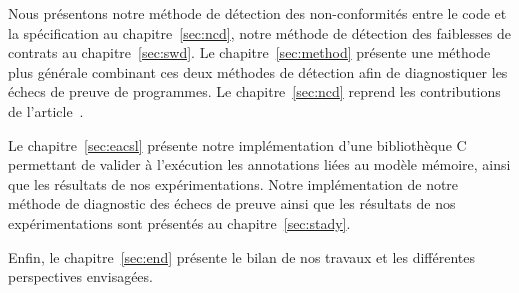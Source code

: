 Nous présentons notre méthode de détection des non-conformités entre le code et
la spécification au chapitre~\ref{sec:ncd}, notre méthode de détection des
faiblesses de contrats au chapitre~\ref{sec:swd}.
Le chapitre~\ref{sec:method} présente une méthode plus générale combinant ces
deux méthodes de détection afin de diagnostiquer les échecs de preuve de
programmes.
Le chapitre~\ref{sec:ncd} reprend les contributions de
l'article~\cite{Petiot/TAP14}.

Le chapitre~\ref{sec:eacsl} présente notre implémentation d'une bibliothèque C
permettant de valider à l'exécution les annotations \acsl liées au modèle
mémoire, ainsi que les résultats de nos expérimentations.
Notre implémentation de notre méthode de diagnostic des échecs de preuve ainsi
que les résultats de nos expérimentations sont présentés au
chapitre~\ref{sec:stady}.

Enfin, le chapitre~\ref{sec:end} présente le bilan de nos travaux et les
différentes perspectives envisagées.
